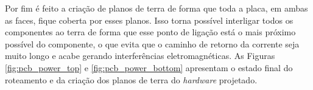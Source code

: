     \begin{figure}[h!]
            \captionsetup{width=10cm}
   \end{figure}


\newpage

Por fim é feito a criação de planos de terra de forma que toda a placa, em ambas as faces, fique coberta por esses planos. Isso torna possível interligar todos os componentes ao terra de forma que esse ponto de ligação está o mais próximo possível do componente, o que evita que o caminho de retorno da corrente seja muito longo e acabe gerando interferências eletromagnéticas. As Figuras \ref{fig:pcb_power_top} e \ref{fig:pcb_power_bottom} apresentam o estado final do roteamento e da criação dos planos de terra do \textit{hardware} projetado.

    \begin{figure}[h!]
            \captionsetup{width=10cm}
   \end{figure}

